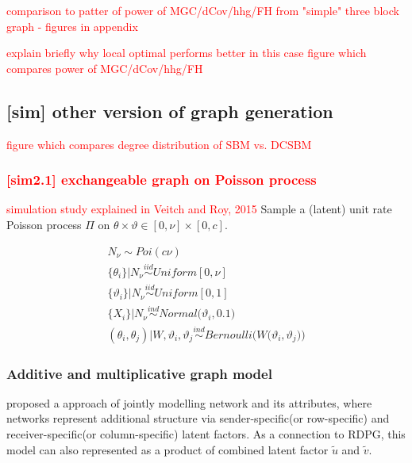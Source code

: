 \documentclass[12pt]{article}
\theoremstyle{definition}
\begin{document}
	
\textcolor{red}{comparison to patter of power of MGC/dCov/hhg/FH from "simple" three block graph - figures in appendix}
	
\textcolor{red}{explain briefly why local optimal performs better in this case}
\textcolor{red}{figure which compares power of MGC/dCov/hhg/FH}
	
	
	
	
	
	
\subsection{[sim] other version of graph generation}
	
	
	
\textcolor{red}{figure which compares degree distribution of SBM vs. DCSBM}
	
\subsubsection{\textcolor{red}{[sim2.1] exchangeable graph on Poisson process}}
	
	
	\textcolor{red}{simulation study explained in Veitch and Roy, 2015}
	Sample a (latent) unit rate Poisson process $\Pi$ on $\theta \times \vartheta \in [0, \nu] \times [0, c]$.
	
	\begin{equation}
	\begin{gathered}
	N_{\nu} \sim Poi( c \nu) \\ 
	\{ \theta_{i} \} \big| N_{\nu} \overset{iid}{\sim} Uniform[0, \nu]  \\ 
	\{ \vartheta_{i} \} \big| N_{\nu} \overset{iid}{\sim} Uniform[0,1] \\ 
	\{ X_{i}  \} | N_{\nu} \overset{ind}{\sim} Normal \big( \vartheta_{i}, 0.1 \big)  \\ 
	(\theta_{i}, \theta_{j}) \big| W, \vartheta_{i}, \vartheta_{j} \overset{ind}{\sim} Bernoulli \big( W\big( \vartheta_{i}, \vartheta_{j} \big) \big) 
	\end{gathered}
	\end{equation}
	
	
	
\subsubsection{Additive and multiplicative graph model}
	
\cite{hoff2002latent} proposed a approach of jointly modelling network and its attributes, where networks represent additional structure via sender-specific(or row-specific) and receiver-specific(or column-specific) latent factors.
As a connection to RDPG, this model can also represented as a product of combined latent factor $\tilde{u}$ and $\tilde{v}$. 
	
\end{document}
